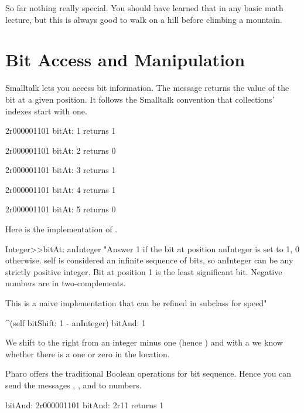 \documentclass[a4paper,10pt,twoside]{book}
\begin{document}
So far nothing really special. You should have learned that in any basic math lecture, but this is always good 
to walk on a hill before climbing a mountain.  



\section{Bit Access and Manipulation}
Smalltalk lets you access bit information. The message  returns the value of the bit at a given position. It follows the Smalltalk convention that collections' indexes start with one. 


\begin{code}{}
2r000001101 bitAt: 1
	returns 1 
	
2r000001101 bitAt: 2
	returns 0 
			
2r000001101 bitAt: 3
	returns 1
	
2r000001101 bitAt: 4
	returns 1
	 
2r000001101 bitAt: 5
	returns 0 	 
\end{code}

Here is the implementation of . 

\begin{code}{}
Integer>>bitAt: anInteger
	"Answer 1 if the bit at position anInteger is set to 1, 0 otherwise.
	self is considered an infinite sequence of bits, so anInteger can be any strictly positive integer.
	Bit at position 1 is the least significant bit.
	Negative numbers are in two-complements.
	
	This is a naive implementation that can be refined in subclass for speed"
	
	^(self bitShift: 1 - anInteger) bitAnd: 1
\end{code}

We shift to the right from an integer minus one (hence )
and with a  we know whether there is a one or zero in the location.



Pharo offers the traditional Boolean operations for bit sequence. Hence you can send the messages , , and  to numbers. 

\begin{code}{bitAnd:}
2r000001101 bitAnd: 2r11
	returns 1 
\end{code}
\end{document}
